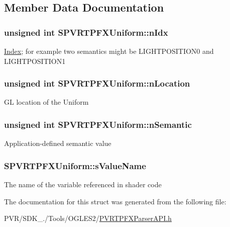 \subsection{Member Data Documentation}
\hypertarget{struct_s_p_v_r_t_p_f_x_uniform_a09dfcda8af5fd331adf4bbba56ed153b}{
\subsubsection[{n\+Idx}]{\setlength{\rightskip}{0pt plus 5cm}unsigned int S\+P\+V\+R\+T\+P\+F\+X\+Uniform\+::n\+Idx}}\label{struct_s_p_v_r_t_p_f_x_uniform_a09dfcda8af5fd331adf4bbba56ed153b}
\hyperlink{struct_index}{Index}; for example two semantics might be L\+I\+G\+H\+T\+P\+O\+S\+I\+T\+I\+O\+N0 and L\+I\+G\+H\+T\+P\+O\+S\+I\+T\+I\+O\+N1 \hypertarget{struct_s_p_v_r_t_p_f_x_uniform_acd819c747bef7ef65a2673fe81f10827}{
\subsubsection[{n\+Location}]{\setlength{\rightskip}{0pt plus 5cm}unsigned int S\+P\+V\+R\+T\+P\+F\+X\+Uniform\+::n\+Location}}\label{struct_s_p_v_r_t_p_f_x_uniform_acd819c747bef7ef65a2673fe81f10827}
G\+L location of the Uniform \hypertarget{struct_s_p_v_r_t_p_f_x_uniform_acfcb0809684e1de9e63c4fcb39cb0e4c}{
\subsubsection[{n\+Semantic}]{\setlength{\rightskip}{0pt plus 5cm}unsigned int S\+P\+V\+R\+T\+P\+F\+X\+Uniform\+::n\+Semantic}}\label{struct_s_p_v_r_t_p_f_x_uniform_acfcb0809684e1de9e63c4fcb39cb0e4c}
Application-\/defined semantic value \hypertarget{struct_s_p_v_r_t_p_f_x_uniform_a9a06b0bca0b8a4ccf07aee21bbbc8d5c}{
\subsubsection[{s\+Value\+Name}]{ S\+P\+V\+R\+T\+P\+F\+X\+Uniform\+::s\+Value\+Name}}\label{struct_s_p_v_r_t_p_f_x_uniform_a9a06b0bca0b8a4ccf07aee21bbbc8d5c}
The name of the variable referenced in shader code 

The documentation for this struct was generated from the following file\+:\begin{DoxyCompactItemize}
\item 
P\+V\+R/\+S\+D\+K\+\_./\+Tools/\+O\+G\+L\+E\+S2/\hyperlink{_p_v_r_t_p_f_x_parser_a_p_i_8h}{P\+V\+R\+T\+P\+F\+X\+Parser\+A\+P\+I.\+h}\end{DoxyCompactItemize}
